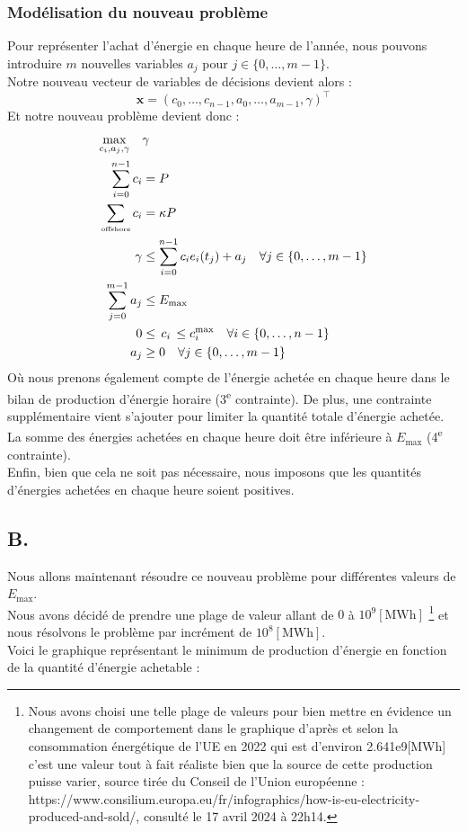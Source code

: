 \documentclass{article}
\begin{document}
\subsubsection*{Modélisation du nouveau problème}
Pour représenter l'achat d'énergie en chaque heure de l'année, nous pouvons introduire $m$ nouvelles variables $a_j$ pour $j \in \{ 0, \ldots, m-1 \}$.\\
Notre nouveau vecteur de variables de décisions devient alors : 
\[ \bm{x} = (c_0, \ldots, c_{n-1}, a_0, \ldots, a_{m-1}, \gamma )^\intercal \]
Et notre nouveau problème devient donc :
\begin{align*}
    \max_{c_i, a_j, \gamma} \quad  &\gamma \\ 
    \sum_{i=0}^{n-1} c_i &= P\\
    \sum_{\text{\tiny offshore}}c_i &= \kappa P\\
    \gamma &\le \sum_{i=0}^{n-1} c_i e_i(t_j) + a_j \quad \forall j \in \{0, \ldots, m-1\}\\
    \sum _{j=0}^{m-1} a_j &\le E_{\text{max}}\\
    0 &\le \, c_i \, \le c_i^{\max} \quad \forall i \in \{0, \ldots, n-1\}\\
    a_j &\ge 0 \quad \forall j \in \{0, \ldots, m-1\}
\end{align*}
Où nous prenons également compte de l'énergie achetée en chaque heure dans le bilan de production d'énergie horaire (3\textsuperscript{e} contrainte).
De plus, une contrainte supplémentaire vient s'ajouter pour limiter la quantité totale d'énergie achetée. La somme des énergies achetées en chaque heure doit être inférieure à $E_{\text{max}}$ (4\textsuperscript{e} contrainte).\\
Enfin, bien que cela ne soit pas nécessaire, nous imposons que les quantités d'énergies achetées en chaque heure soient positives.

\pagebreak

\subsection*{B.}
Nous allons maintenant résoudre ce nouveau problème pour différentes valeurs de $E_{\text{max}}$.\\
Nous avons décidé de prendre une plage de valeur allant de $0$ à $10^{9} [\mathrm{MWh}]$
\footnote{Nous avons choisi une telle plage de valeurs pour bien mettre en évidence un changement de comportement dans le graphique d'après et selon la consommation énergétique de l'UE en 2022 qui est d'environ 2.641e9[MWh] c'est une valeur tout à fait réaliste bien que la source de cette production puisse varier, source tirée du  Conseil de l'Union européenne : https://www.consilium.europa.eu/fr/infographics/how-is-eu-electricity-produced-and-sold/, consulté le 17 avril 2024 à 22h14.}
et nous résolvons le problème par incrément de $10^8 [\mathrm{MWh}]$.\\
Voici le graphique représentant le minimum de production d'énergie en fonction de la quantité d'énergie achetable :
\end{document}
